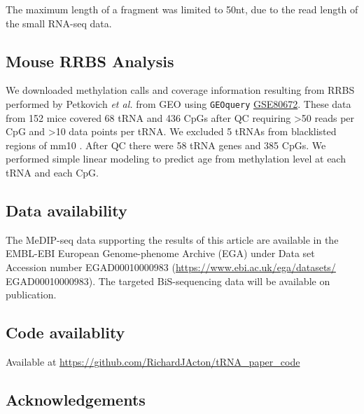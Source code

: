 \documentclass[]{book}
\begin{document}
The maximum length of a fragment was limited to 50nt, due to the read length of the small RNA-seq data.

\hypertarget{mousemethods}{%
\subsection{Mouse RRBS Analysis}\label{mousemethods}}

We downloaded methylation calls and coverage information resulting from RRBS performed by Petkovich \emph{et al.} \citep{Petkovich2017} from GEO using \texttt{GEOquery} \citep{Davis2007p} \href{https://www.ncbi.nlm.nih.gov/geo/query/acc.cgi?acc=GSE80672}{GSE80672}.
These data from 152 mice covered 68 tRNA and 436 CpGs after QC requiring \textgreater50 reads per CpG and \textgreater10 data points per tRNA.
We excluded 5 tRNAs from blacklisted regions of mm10 \citep{Amemiya2019}.
After QC there were 58 tRNA genes and 385 CpGs.
We performed simple linear modeling to predict age from methylation level at each tRNA and each CpG.

\hypertarget{data-availability}{%
\subsection{Data availability}\label{data-availability}}

The MeDIP-seq data supporting the results of this article are available in the EMBL-EBI European Genome-phenome Archive (EGA) under Data set Accession number EGAD00010000983 (\url{https://www.ebi.ac.uk/ega/datasets/}
EGAD00010000983).
The targeted BiS-sequencing data will be available on publication.

\hypertarget{code-availablity}{%
\subsection{Code availablity}\label{code-availablity}}

Available at \url{https://github.com/RichardJActon/tRNA_paper_code}

\newpage

\hypertarget{acknowledgements-1}{%
\subsection{Acknowledgements}\label{acknowledgements-1}}
\end{document}
